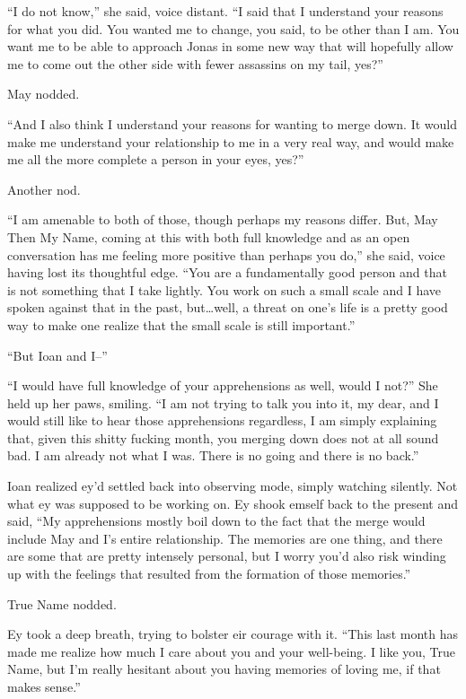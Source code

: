 ``I do not know,'' she said, voice distant. ``I said that I understand your reasons for what you did. You wanted me to change, you said, to be other than I am. You want me to be able to approach Jonas in some new way that will hopefully allow me to come out the other side with fewer assassins on my tail, yes?''

May nodded.

``And I also think I understand your reasons for wanting to merge down. It would make me understand your relationship to me in a very real way, and would make me all the more complete a person in your eyes, yes?''

Another nod.

``I am amenable to both of those, though perhaps my reasons differ. But, May Then My Name, coming at this with both full knowledge and as an open conversation has me feeling more positive than perhaps you do,'' she said, voice having lost its thoughtful edge. ``You are a fundamentally good person and that is not something that I take lightly. You work on such a small scale and I have spoken against that in the past, but\ldots well, a threat on one's life is a pretty good way to make one realize that the small scale is still important.''

``But Ioan and I--''

``I would have full knowledge of your apprehensions as well, would I not?'' She held up her paws, smiling. ``I am not trying to talk you into it, my dear, and I would still like to hear those apprehensions regardless, I am simply explaining that, given this shitty fucking month, you merging down does not at all sound bad. I am already not what I was. There is no going and there is no back.''

Ioan realized ey'd settled back into observing mode, simply watching silently. Not what ey was supposed to be working on. Ey shook emself back to the present and said, ``My apprehensions mostly boil down to the fact that the merge would include May and I's entire relationship. The memories are one thing, and there are some that are pretty intensely personal, but I worry you'd also risk winding up with the feelings that resulted from the formation of those memories.''

True Name nodded.

Ey took a deep breath, trying to bolster eir courage with it. ``This last month has made me realize how much I care about you and your well-being. I like you, True Name, but I'm really hesitant about you having memories of loving me, if that makes sense.''

